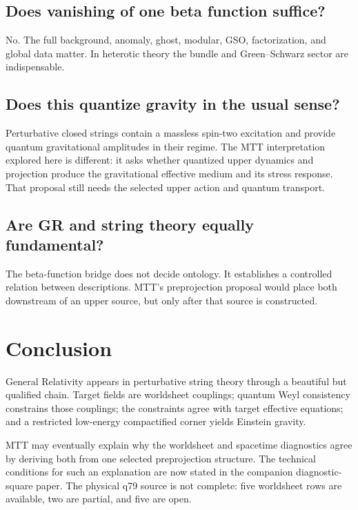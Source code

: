 \documentclass[11pt]{article}
\begin{document}
\subsection{Does vanishing of one beta function suffice?}

No.  The full background, anomaly, ghost, modular, GSO, factorization, and
global data matter.  In heterotic theory the bundle and Green--Schwarz sector
are indispensable.

\subsection{Does this quantize gravity in the usual sense?}

Perturbative closed strings contain a massless spin-two excitation and provide
quantum gravitational amplitudes in their regime.  The MTT interpretation
explored here is different: it asks whether quantized upper dynamics and
projection produce the gravitational effective medium and its stress response.
That proposal still needs the selected upper action and quantum transport.

\subsection{Are GR and string theory equally fundamental?}

The beta-function bridge does not decide ontology.  It establishes a
controlled relation between descriptions.  MTT's preprojection proposal would
place both downstream of an upper source, but only after that source is
constructed.

\section{Conclusion}

General Relativity appears in perturbative string theory through a beautiful
but qualified chain.  Target fields are worldsheet couplings; quantum Weyl
consistency constrains those couplings; the constraints agree with target
effective equations; and a restricted low-energy compactified corner yields
Einstein gravity.

MTT may eventually explain why the worldsheet and spacetime diagnostics agree
by deriving both from one selected preprojection structure.  The technical
conditions for such an explanation are now stated in the companion
diagnostic-square paper.  The physical q79 source is not complete: five
worldsheet rows are available, two are partial, and five are open.
\end{document}
